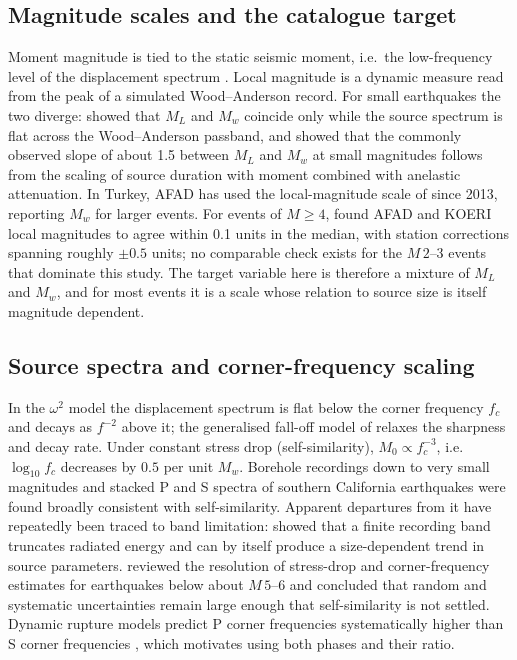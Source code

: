 \documentclass[11pt,a4paper]{article}
\newcommand{\fc}{f_c}
\begin{document}
\subsection{Magnitude scales and the catalogue target}
Moment magnitude is tied to the static seismic moment, i.e.\ the
low-frequency level of the displacement spectrum \citep{hanks1979}. Local
magnitude is a dynamic measure read from the peak of a simulated
Wood--Anderson record. For small earthquakes the two diverge:
\citet{deichmann2006} showed that $M_L$ and $M_w$ coincide only while the
source spectrum is flat across the Wood--Anderson passband, and
\citet{deichmann2017} showed that the commonly observed slope of about 1.5
between $M_L$ and $M_w$ at small magnitudes follows from the scaling of
source duration with moment combined with anelastic attenuation. In
Turkey, AFAD has used the local-magnitude scale of \citet{kilic2017} since
2013, reporting $M_w$ for larger events. For events of $M \geq 4$,
\citet{rojolimon2023} found AFAD and KOERI local magnitudes to agree within
0.1 units in the median, with station corrections spanning roughly
$\pm 0.5$ units; no comparable check exists for the $M\,2$--3 events that
dominate this study. The target variable here is therefore a mixture of
$M_L$ and $M_w$, and for most events it is a scale whose relation to source
size is itself magnitude dependent.

\subsection{Source spectra and corner-frequency scaling}
In the $\omega^{2}$ model \citep{brune1970} the displacement spectrum is flat
below the corner frequency $\fc$ and decays as $f^{-2}$ above it; the
generalised fall-off model of \citet{boatwright1980} relaxes the sharpness
and decay rate. Under constant stress drop (self-similarity),
$M_0 \propto \fc^{-3}$, i.e.\ $\log_{10}\fc$ decreases by $0.5$ per unit $M_w$.
Borehole recordings down to very small magnitudes \citep{abercrombie1995}
and stacked P and S spectra of southern California earthquakes
\citep{prieto2004} were found broadly consistent with self-similarity.
Apparent departures from it have repeatedly been traced to band limitation:
\citet{ide2001} showed that a finite recording band truncates radiated
energy and can by itself produce a size-dependent trend in source
parameters. \citet{abercrombie2021} reviewed the resolution of stress-drop
and corner-frequency estimates for earthquakes below about $M\,5$--6 and
concluded that random and systematic uncertainties remain large enough
that self-similarity is not settled. Dynamic rupture models predict P
corner frequencies systematically higher than S corner frequencies
\citep{kaneko2014}, which motivates using both phases and their ratio.
\end{document}
